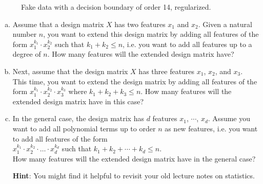 \begin{figure}[!th]
\caption{Fake data with a decision boundary of order 14, regularized.}
\label{fig:fake-data-14-reg.pdf}
\end{figure}

\exercise
\begin{enumerate}[(a)]
\item Assume that a design matrix $X$ has two features $x_1$ and $x_2$.  Given a natural number $n$, you want to
      extend this design matrix by adding all features of the form $x_1^{k_1} \cdot x_2^{k_2}$ such that
      $k_1 + k_2 \leq n$, i.e. you want to add all features up to a degree of $n$.
      How many features will the extended design matrix have?
\item Next, assume that the design matrix $X$ has three features $x_1$, $x_2$, and $x_3$.
      This time, you want to extend the design matrix by adding all features of the form
      $x_1^{k_1} \cdot x_2^{k_2} \cdot x_3^{k_3}$ where $k_1 + k_2 + k_3 \leq n$.
      How many features will the extended design matrix have in this case?
\item In the general case, the design matrix has $d$ features $x_1$, $\cdots$, $x_d$.  Assume you want to add all
     polynomial terms up to order $n$ as new features, i.e. you want to add all features of the form
     \\[0.2cm]
     \hspace*{1.3cm}
     $x_1^{k_1} \cdot x_2^{k_2} \cdot {\dots} \cdot x_d^{k_d}$ \quad such that $k_1 + k_2 + \cdots + k_d \leq n$.
     \\[0.2cm]
     How many features will the extended design matrix have in the general case?

     \textbf{Hint}:  You might find it helpful to revisit your old lecture notes on statistics.
     \eox
\end{enumerate}


